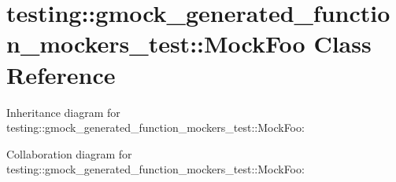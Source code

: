 \hypertarget{classtesting_1_1gmock__generated__function__mockers__test_1_1_mock_foo}{}\section{testing\+:\+:gmock\+\_\+generated\+\_\+function\+\_\+mockers\+\_\+test\+:\+:Mock\+Foo Class Reference}
\label{classtesting_1_1gmock__generated__function__mockers__test_1_1_mock_foo}


Inheritance diagram for testing\+:\+:gmock\+\_\+generated\+\_\+function\+\_\+mockers\+\_\+test\+:\+:Mock\+Foo\+:


Collaboration diagram for testing\+:\+:gmock\+\_\+generated\+\_\+function\+\_\+mockers\+\_\+test\+:\+:Mock\+Foo\+:
